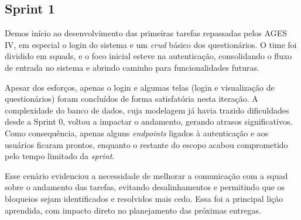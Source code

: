 \subsection{Sprint 1}

Demos início ao desenvolvimento das primeiras tarefas repassadas pelos AGES IV, em especial o login do sistema e um \textit{\ac{crud}} básico dos questionários. O time foi dividido em squads, e o foco inicial esteve na autenticação, consolidando o fluxo de entrada no sistema e abrindo caminho para funcionalidades futuras.

Apesar dos esforços, apenas o login e algumas telas (login e visualização de questionários) foram concluídos de forma satisfatória nesta iteração. A complexidade do banco de dados, cuja modelagem já havia trazido dificuldades desde a Sprint 0, voltou a impactar o andamento, gerando atrasos significativos. Como consequência, apenas alguns \textit{endpoints} ligados à autenticação e aos usuários ficaram prontos, enquanto o restante do escopo acabou comprometido pelo tempo limitado da \textit{sprint}.

Esse cenário evidenciou a necessidade de melhorar a comunicação com a squad sobre o andamento das tarefas, evitando desalinhamentos e permitindo que os bloqueios sejam identificados e resolvidos mais cedo. Essa foi a principal lição aprendida, com impacto direto no planejamento das próximas entregas.
\\

\noindent{}
